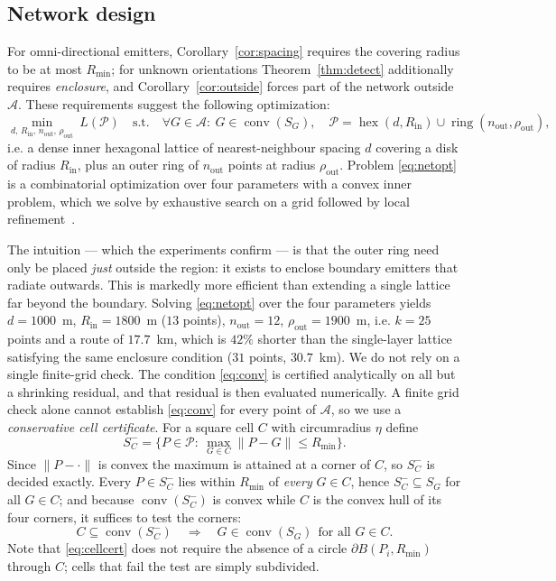 \documentclass[preprint,12pt,3p]{elsarticle}
\theoremstyle{definition}
\newcommand{\conv}{\operatorname{conv}}
\newcommand{\Rmin}{R_{\min}}
\newcommand{\bA}{\mathcal{A}}
\newcommand{\bP}{\mathcal{P}}
\begin{document}
\subsection{Network design}
\label{sec:network}

For omni-directional emitters, Corollary~\ref{cor:spacing} requires the covering radius to be at
most $\Rmin$; for unknown orientations Theorem~\ref{thm:detect} additionally requires
\emph{enclosure}, and Corollary~\ref{cor:outside} forces part of the network outside $\bA$. These
requirements suggest the following optimization:
\begin{equation}
\min_{d,\,R_{\mathrm{in}},\,n_{\mathrm{out}},\,\rho_{\mathrm{out}}}\ L(\bP)
\quad\text{s.t.}\quad \forall G\in\bA:\ G\in\conv(S_G),
\quad
\bP=\operatorname{hex}(d,R_{\mathrm{in}})\cup\operatorname{ring}(n_{\mathrm{out}},\rho_{\mathrm{out}}),
\label{eq:netopt}
\end{equation}
i.e. a dense inner hexagonal lattice of nearest-neighbour spacing $d$ covering a disk of radius
$R_{\mathrm{in}}$, plus an outer ring of $n_{\mathrm{out}}$ points at radius
$\rho_{\mathrm{out}}$. Problem \eqref{eq:netopt} is a combinatorial optimization over four
parameters with a convex inner problem, which we solve by exhaustive search on a grid followed by
local refinement~\cite{boyd2004}.

The intuition --- which the experiments confirm --- is that the outer ring need only be placed
\emph{just} outside the region: it exists to enclose boundary emitters that radiate outwards. This
is markedly more efficient than extending a single lattice far beyond the boundary. Solving
\eqref{eq:netopt} over the four parameters yields
$d=1000$~m, $R_{\mathrm{in}}=1800$~m ($13$ points), $n_{\mathrm{out}}=12$,
$\rho_{\mathrm{out}}=1900$~m, i.e. $k=25$ points and a route of $17.7$~km, which is $42\%$ shorter
than the single-layer lattice satisfying the same enclosure condition ($31$ points, $30.7$~km). We do
not rely on a single finite-grid check. The condition \eqref{eq:conv} is certified analytically on
all but a shrinking residual, and that residual is then evaluated numerically. A finite grid check
alone cannot establish \eqref{eq:conv} for every point of $\bA$, so we use a \emph{conservative
cell certificate}. For a square cell $C$ with circumradius $\eta$ define
\begin{equation}
S_C^-=\{P\in\bP:\ \textstyle\max_{G\in C}\|P-G\|\le\Rmin\}.
\label{eq:Sminus}
\end{equation}
Since $\|P-\cdot\|$ is convex the maximum is attained at a corner of $C$, so $S_C^-$ is decided
exactly. Every $P\in S_C^-$ lies within $\Rmin$ of \emph{every} $G\in C$, hence
$S_C^-\subseteq S_G$ for all $G\in C$; and because $\conv(S_C^-)$ is convex while $C$ is the
convex hull of its four corners, it suffices to test the corners:
\begin{equation}
C\subseteq\conv(S_C^-)\quad\Longrightarrow\quad G\in\conv(S_G)\ \ \text{for all }G\in C.
\label{eq:cellcert}
\end{equation}
Note that \eqref{eq:cellcert} does not require the absence of a circle
$\partial B(P_i,\Rmin)$ through $C$; cells that fail the test are simply subdivided.
\end{document}
